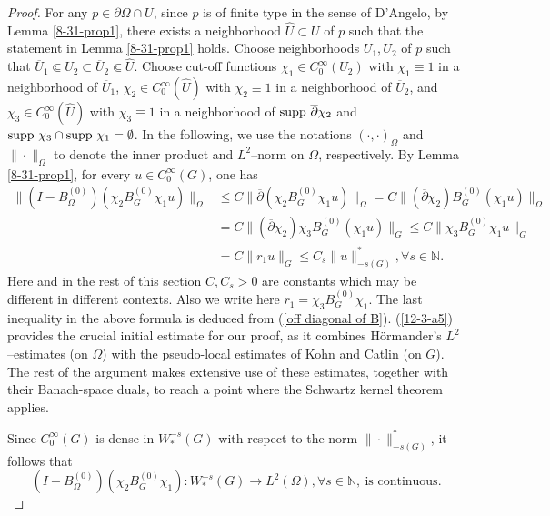 \documentclass[a4paper,centertags,oneside,12pt]{amsart}
\numberwithin{equation}{section}
\begin{document}
\begin{proof}
For any $p\in\partial \Omega\cap U$, since $p$ is of finite type in the sense of D'Angelo,  by Lemma \ref{8-31-prop1}, there exists a neighborhood $\widehat U\subset U$ of $p$ such that the statement in Lemma \ref{8-31-prop1} holds.
Choose neighborhoods $U_1, U_2$ of $p$ such that $\overline U_1\Subset U_2\subset\overline U_2\Subset \widehat U$. Choose cut-off functions $\chi_1\in C_0^\infty(U_2)$ with $\chi_1\equiv 1$ in a neighborhood of $\overline U_1$, $\chi_2\in C_0^\infty (\widehat U)$ with $\chi_2\equiv 1$ in a neighborhood of $\overline U_2$, and $\chi_3\in C_0^\infty(\widehat U)$ with $\chi_3\equiv1$ in a neighborhood of ${\rm supp}~\overline\partial\chi_2$ and ${\rm supp}~\chi_3\cap{\rm supp}~\chi_1=\emptyset$.
In the following, we use the notations
$(\cdot, \cdot)_{\Omega}$ and
 $\|\cdot\|_{\Omega}$ to denote the inner product and $L^2$--norm on $\Omega$, respectively. 
    By Lemma \ref{8-31-prop1}, for every $u\in C_0^\infty(G)$, one has
    \begin{equation}\label{12-3-a5}
    \begin{split}
        \|(I-B_\Omega^{(0)})(\chi_2B_{G}^{(0)}\chi_1u)\|_{\Omega}&\leq C\|\overline\partial(\chi_2 B_{G}^{(0)}\chi_1u)\|_{\Omega}
        =C\|(\overline\partial \chi_2) B_G^{(0)}(\chi_1 u)\|_\Omega\\
        &=C\|(\overline\partial \chi_2)\chi_3 B_G^{(0)}(\chi_1 u)\|_{G}
        \leq  C\|\chi_3 B_{G}^{(0)}\chi_1 u\|_{G}\\
        &= C\|r_1 u\|_{G}
        \leq C_s\|u\|^\ast_{-s(G)}, \forall s\in\mathbb N.
        \end{split}
    \end{equation}
Here  and in the rest of this section $C, C_s>0$  are constants which may be different in different contexts. Also we write here  $r_1=\chi_3 B_{G}^{(0)}\chi_1$. The last inequality in the above formula is deduced from (\ref{off diagonal of B}).
(\ref{12-3-a5}) provides the crucial initial estimate for our proof, as it combines Hörmander’s $L^2$--estimates (on $\Omega$) with the pseudo-local estimates of Kohn and Catlin (on $G$). 
The rest of the argument makes extensive use of these estimates, together with their Banach-space duals, to reach a point where the Schwartz kernel theorem applies.


Since $C_0^\infty(G)$ is dense in $W_\ast^{-s}(G)$ with respect to the norm $\|\cdot\|^\ast_{-s(G)}$, it follows that 
\begin{equation}\label{1-21-a3}
    (I-B_\Omega^{(0)})(\chi_2B_{G}^{(0)}\chi_1): W_\ast^{-s}(G)\rightarrow L^2(\Omega), \forall s\in\mathbb N, ~\text{is continuous}.
    \end{equation}
    



\end{proof}
\end{document}
